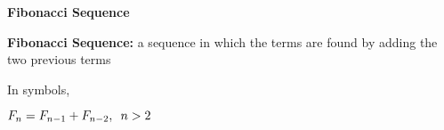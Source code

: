 \begin{center}
\textbf{Fibonacci Sequence}
\end{center}

\vspace*{1ex}


\textbf{Fibonacci Sequence:} a sequence in which the terms are found by adding the two previous terms 

\vspce

In symbols, 

\vspce

\begin{center}
$\displaystyle F_n=F_{n-1}+F_{n-2}, \hspace{0.5em} n>2$ 
\end{center}


